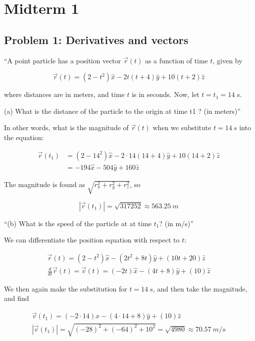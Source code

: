 \documentclass[8.01x]{subfiles}
\begin{document}
\chapter{Midterm 1}

\section{Problem 1: Derivatives and vectors}

``A point particle has a position vector $\vec{r}(t)$ as a function of time $t$, given by

\begin{equation}
\vec{r}(t) = (2-t^2)\hat{x} - 2t(t+4)\hat{y} + 10(t+2)\hat{z}
\end{equation}

where distances are in meters, and time $t$ is in seconds. Now, let $t = t_1 = 14$ s.

(a) What is the distance of the particle to the origin at time t1 ? (in meters)''

In other words, what is the magnitude of $\vec{r}(t)$ when we substitute $t = \SI{14}{s}$ into the equation:

\begin{align}
\vec{r}(t_1) &= (2-14^2)\hat{x} - 2\cdot14(14+4)\hat{y} + 10(14+2)\hat{z}\\
          &= -194\hat{x} - 504\hat{y} + 160 \hat{z}
\end{align}

The magnitude is found as $\sqrt{r_x^2 + r_y^2 + r_z^2}$, so

\begin{equation}
|\vec{r}(t_1)| = \sqrt{317252} \approx \SI{563.25}{m}
\end{equation}

``(b) What is the speed of the particle at at time $t_1$? (in m/s)''

We can differentiate the position equation with respect to $t$:

\begin{align}
\vec{r}(t) = (2-t^2)\hat{x} - (2t^2+8t)\hat{y} + (10t+20)\hat{z}\\
\frac{d}{dt} \vec{r}(t) = \vec{v}(t) = (-2t)\hat{x} - (4t+8)\hat{y} + (10)\hat{z}
\end{align}

We then again make the substitution for $t = \SI{14}{s}$, and then take the magnitude, and find 

\begin{align}
\vec{v}(t_1) = (-2 \cdot 14)\hat{x} - (4 \cdot 14 + 8)\hat{y} + (10)\hat{z}\\
|\vec{v}(t_1)| = \sqrt{(-28)^2 + (-64)^2 + 10^2} = \sqrt{4980} \approx \SI{70.57}{m/s}
\end{align}
\end{document}
